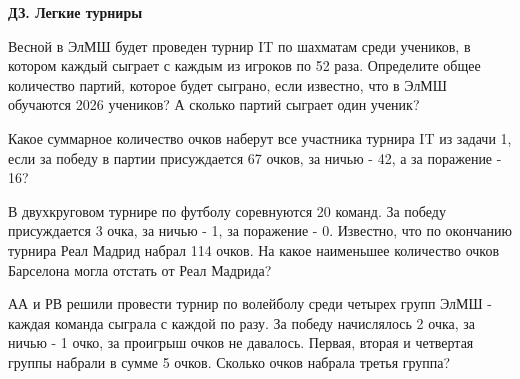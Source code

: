 \centerline{\bf \Huge ДЗ. Легкие турниры}

 Весной в ЭлМШ будет проведен турнир IT по шахматам среди учеников, в котором каждый сыграет с каждым из игроков по 52 раза. Определите общее количество партий, которое будет сыграно, если известно, что в ЭлМШ обучаются 2026 учеников? А сколько партий сыграет один ученик?

 Какое суммарное количество очков наберут все участника турнира IT из задачи 1, если за победу в партии присуждается 67 очков, за ничью - 42, а за поражение - 16?

 В двухкруговом турнире по футболу соревнуются 20 команд. За победу присуждается 3 очка, за ничью - 1, за поражение - 0. Известно, что по окончанию турнира Реал Мадрид набрал 114 очков. На какое наименьшее количество очков Барселона могла отстать от Реал Мадрида?

 АА и РВ решили провести турнир по волейболу среди четырех групп ЭлМШ - каждая команда сыграла с каждой по разу. За победу начислялось 2 очка, за ничью - 1 очко, за проигрыш очков не давалось. Первая, вторая и четвертая группы набрали в сумме 5 очков. Сколько очков набрала третья группа?



